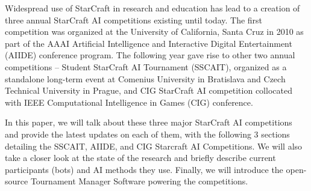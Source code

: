 Widespread use of StarCraft in research and education has lead to a creation of three annual StarCraft AI competitions existing until today. The first competition was organized at the University of California, Santa Cruz in 2010 as part of the AAAI Artificial Intelligence and Interactive Digital Entertainment (AIIDE) conference program. The following year gave rise to other two annual competitions -- Student StarCraft AI Tournament (SSCAIT), organized as a standalone long-term event at Comenius University in Bratislava and Czech Technical University in Prague, and CIG StarCraft AI competition collocated with IEEE Computational Intelligence in Games (CIG) conference.

In this paper, we will talk about these three major StarCraft AI competitions and provide the latest updates on each of them, with the following 3 sections detailing the SSCAIT, AIIDE, and CIG Starcraft AI Competitions. We will also take a closer look at the state of the research and briefly describe current participants (bots) and AI methods they use. Finally, we will introduce the open-source Tournament Manager Software powering the competitions. 




